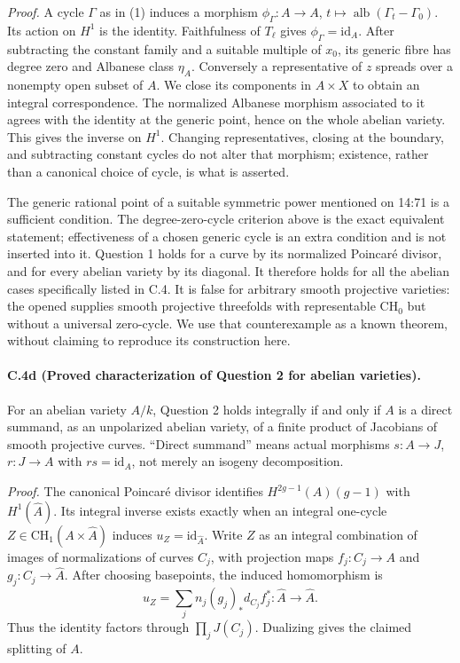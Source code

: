 \emph{Proof.}
A cycle $\Gamma$ as in (1) induces a morphism
$\phi_\Gamma:A\to A$, $t\mapsto
\operatorname{alb}(\Gamma_t-\Gamma_0)$. Its action on $H^1$ is the
identity. Faithfulness of $T_\ell$ gives $\phi_\Gamma=\mathrm{id}_A$.
After subtracting the constant family and a suitable multiple of
$x_0$, its generic fibre has degree zero and Albanese class $\eta_A$.
Conversely a representative of $z$ spreads over a nonempty open
subset of $A$. We close its components in $A\times X$ to obtain an
integral correspondence. The normalized Albanese morphism associated
to it agrees with the identity at the generic point, hence on the
whole abelian variety. This gives the inverse on $H^1$.
Changing representatives, closing at the boundary, and subtracting
constant cycles do not alter that morphism; existence, rather than a
canonical choice of cycle, is what is asserted.

The generic rational point of a suitable symmetric power mentioned
on 14:71 is a sufficient condition. The degree-zero-cycle criterion
above is the exact equivalent statement; effectiveness of a chosen
generic cycle is an extra condition and is not inserted into it.
Question 1 holds for a curve by its normalized Poincar\'e divisor,
and for every abelian variety by its diagonal. It therefore holds for
all the abelian cases specifically listed in C.4. It is false for
arbitrary smooth projective varieties: the opened
\citet[Theorem 1.4]{cyVoisin2025} supplies smooth projective threefolds
with representable $\mathrm{CH}_0$ but without a universal zero-cycle.
We use that counterexample as a known theorem, without claiming to
reproduce its construction here.

\paragraph{C.4d (Proved characterization of Question 2 for abelian varieties).}
For an abelian variety $A/k$, Question 2 holds integrally if and only
if $A$ is a direct summand, as an unpolarized abelian variety, of a
finite product of Jacobians of smooth projective curves. ``Direct
summand'' means actual morphisms $s:A\to J$, $r:J\to A$ with
$rs=\mathrm{id}_A$, not merely an isogeny decomposition.

\emph{Proof.}
The canonical Poincar\'e divisor identifies
$H^{2g-1}(A)(g-1)$ with $H^1(\widehat A)$. Its integral inverse exists
exactly when an integral one-cycle
$Z\in\mathrm{CH}_1(A\times\widehat A)$ induces
$u_Z=\mathrm{id}_{\widehat A}$. Write $Z$ as an integral combination
of images of normalizations of curves $C_j$, with projection maps
$f_j:C_j\to A$ and $g_j:C_j\to\widehat A$. After choosing basepoints,
the induced homomorphism is
\[
 u_Z=\sum_j n_j(g_j)_*d_{C_j}f_j^*:
 \widehat A\longrightarrow\widehat A.
\]
Thus the identity factors through $\prod_j J(C_j)$. Dualizing gives
the claimed splitting of $A$.

